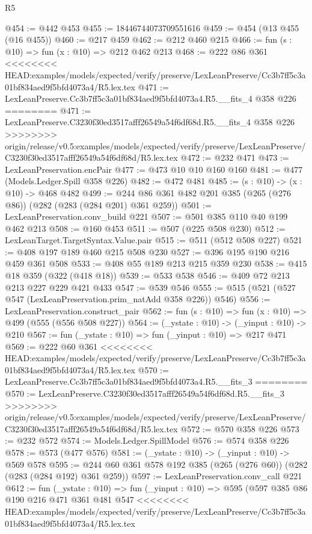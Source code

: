 \begin{lexlean}{R5}
\begin{coremodule}
{{{{{{{{{{{{{@454 := @442 @453
@455 := 18446744073709551616
@459 := @454 (@13 @455 (@16 @455))
@460 := @217 @459
@462 := @212 @460 @215
@466 := fun (s : @10) => fun (x : @10) => @212 @462 @213
@468 := @222 @86 @361
<<<<<<<< HEAD:examples/models/expected/verify/preserve/LexLeanPreserve/Cc3b7ff5c3a01bf834aed9f5bfd4073a4/R5.lex.tex
@471 := LexLeanPreserve.Cc3b7ff5c3a01bf834aed9f5bfd4073a4.R5.__fits_4 @358 @226
========
@471 := LexLeanPreserve.C3230f30ed3517afff26549a54f6df68d.R5.__fits_4 @358 @226
>>>>>>>> origin/release/v0.5:examples/models/expected/verify/preserve/LexLeanPreserve/C3230f30ed3517afff26549a54f6df68d/R5.lex.tex
@472 := @232 @471
@473 := LexLeanPreservation.encPair
@477 := @473 @10 @10 @160 @160
@481 := @477 (Models.Ledger.Spill @358 @226)
@482 := @472 @481
@485 := (s : @10) -> (x : @10) -> @468 @482
@499 := @244 @86 @361 @482 @201 @385 (@265 (@276 @86)) (@282 (@283 (@284 @201) @361 @259))
@501 := LexLeanPreservation.conv_build @221
@507 := @501 @385 @110 @40 @199 @462 @213
@508 := @160 @453
@511 := @507 (@225 @508 @230)
@512 := LexLeanTarget.TargetSyntax.Value.pair
@515 := @511 (@512 @508 @227)
@521 := @408 @197 @189 @460 @215 @508 @230
@527 := @396 @195 @190 @216 @459 @361 @508
@533 := @408 @55 @189 @213 @215 @359 @230
@538 := @415 @18 @359 (@322 (@418 @18))
@539 := @533 @538
@546 := @409 @72 @213 @213 @227 @229 @421 @433
@547 := @539 @546
@555 := @515 (@521 (@527 @547 (LexLeanPreservation.prim_natAdd @358 @226)) @546)
@556 := LexLeanPreservation.construct_pair
@562 := fun (s : @10) => fun (x : @10) => @499 (@555 (@556 @508 @227))
@564 := (_ystate : @10) -> (_yinput : @10) -> @210
@567 := fun (_ystate : @10) => fun (_yinput : @10) => @217 @471
@569 := @222 @60 @361
<<<<<<<< HEAD:examples/models/expected/verify/preserve/LexLeanPreserve/Cc3b7ff5c3a01bf834aed9f5bfd4073a4/R5.lex.tex
@570 := LexLeanPreserve.Cc3b7ff5c3a01bf834aed9f5bfd4073a4.R5.__fits_3
========
@570 := LexLeanPreserve.C3230f30ed3517afff26549a54f6df68d.R5.__fits_3
>>>>>>>> origin/release/v0.5:examples/models/expected/verify/preserve/LexLeanPreserve/C3230f30ed3517afff26549a54f6df68d/R5.lex.tex
@572 := @570 @358 @226
@573 := @232 @572
@574 := Models.Ledger.SpillModel
@576 := @574 @358 @226
@578 := @573 (@477 @576)
@581 := (_ystate : @10) -> (_yinput : @10) -> @569 @578
@595 := @244 @60 @361 @578 @192 @385 (@265 (@276 @60)) (@282 (@283 (@284 @192) @361 @259))
@597 := LexLeanPreservation.conv_call @221
@612 := fun (_ystate : @10) =>
  fun (_yinput : @10) =>
  @595
    (@597
      @385
      @86
      @190
      @216
      @471
      @361
      @481
      @547
<<<<<<<< HEAD:examples/models/expected/verify/preserve/LexLeanPreserve/Cc3b7ff5c3a01bf834aed9f5bfd4073a4/R5.lex.tex
}}}}}}}}}}}}}
\end{coremodule}
\end{lexlean}
